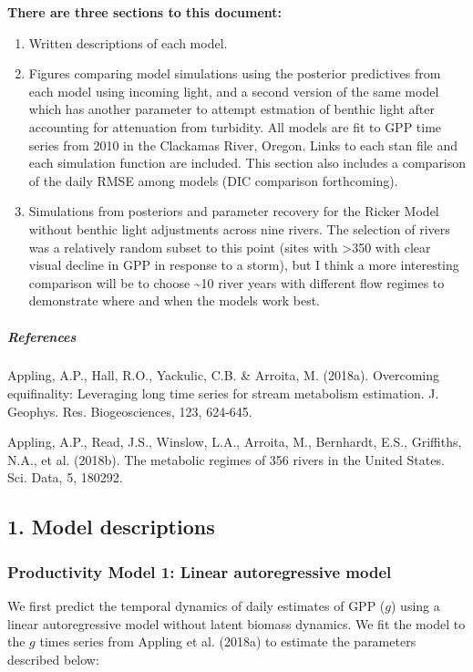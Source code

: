 \documentclass[]{article}
\let\oldsubparagraph\subparagraph
\renewcommand{\subparagraph}[1]{\oldsubparagraph{#1}\mbox{}}
\begin{document}
\textbf{There are three sections to this document:}

\begin{enumerate}
\def\labelenumi{\arabic{enumi}.}
\item
  Written descriptions of each model.
\item
  Figures comparing model simulations using the posterior predictives
  from each model using incoming light, and a second version of the same
  model which has another parameter to attempt estmation of benthic
  light after accounting for attenuation from turbidity. All models are
  fit to GPP time series from 2010 in the Clackamas River, Oregon. Links
  to each stan file and each simulation function are included. This
  section also includes a comparison of the daily RMSE among models (DIC
  comparison forthcoming).
\item
  Simulations from posteriors and parameter recovery for the Ricker
  Model without benthic light adjustments across nine rivers. The
  selection of rivers was a relatively random subset to this point
  (sites with \textgreater{}350 with clear visual decline in GPP in
  response to a storm), but I think a more interesting comparison will
  be to choose \textasciitilde{}10 river years with different flow
  regimes to demonstrate where and when the models work best.
\end{enumerate}

\subparagraph{References}\label{references}

Appling, A.P., Hall, R.O., Yackulic, C.B. \& Arroita, M. (2018a).
Overcoming equifinality: Leveraging long time series for stream
metabolism estimation. J. Geophys. Res. Biogeosciences, 123, 624-645.

Appling, A.P., Read, J.S., Winslow, L.A., Arroita, M., Bernhardt, E.S.,
Griffiths, N.A., et al. (2018b). The metabolic regimes of 356 rivers in
the United States. Sci. Data, 5, 180292.

\subsection{1. Model descriptions}\label{model-descriptions}

\subsubsection{Productivity Model 1: Linear autoregressive
model}\label{productivity-model-1-linear-autoregressive-model}

We first predict the temporal dynamics of daily estimates of GPP (\(g\))
using a linear autoregressive model without latent biomass dynamics. We
fit the model to the \(g\) times series from Appling et al. (2018a) to
estimate the parameters described below:
\end{document}
